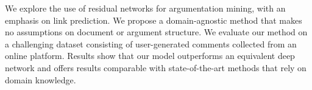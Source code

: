 We explore the use of residual networks for argumentation mining, with an emphasis on link prediction. We propose a domain-agnostic method that makes no assumptions on document or argument structure. We evaluate our method on a challenging dataset consisting of user-generated comments collected from an online platform. Results show that our model outperforms an equivalent deep network and offers results comparable with state-of-the-art methods that rely on domain knowledge.
